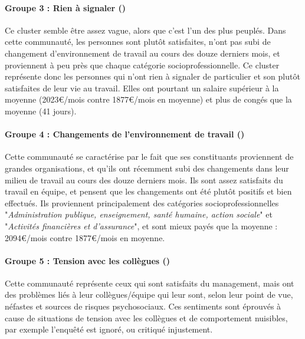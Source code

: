 \documentclass[11pt,fleqn,openany,frenchb]{book} %
\begin{document}
\paragraph{Groupe 3 : Rien à signaler (\RAS)\\}
Ce cluster semble être assez vague, alors que c'est l'un des plus peuplés. Dans cette communauté, les personnes sont plutôt satisfaites, n'ont pas subi de changement d'environnement de travail au cours des douze derniers mois, et proviennent à peu près que chaque catégorie socioprofessionnelle. Ce cluster représente donc les personnes qui n'ont rien à signaler de particulier et son plutôt satisfaites de leur vie au travail. Elles ont pourtant un salaire supérieur à la moyenne (2023\euro{}/mois contre 1877\euro{}/mois en moyenne) et plus de congés que la moyenne (41 jours).

\paragraph{Groupe 4 : Changements   de   l'environnement   de
travail (\GLOB)\\}
Cette communauté se caractérise par le fait que ses constituants proviennent de grandes organisations, et qu'ils ont récemment subi des changements dans leur milieu de travail au cours des douze derniers mois. Ils sont assez satisfaits du travail en équipe, et pensent que les changements ont été plutôt positifs et bien effectués. Ils proviennent principalement des catégories socioprofessionnelles "\textit{Administration publique, enseignement, santé humaine, action sociale}" et "\textit{Activités financières et d'assurance}", et sont mieux payés que la moyenne : 2094\euro{}/mois contre 1877\euro{}/mois en moyenne.

\paragraph{Groupe 5 : Tension avec les collègues (\ENV)\\}
Cette communauté représente ceux qui sont satisfaits du management, mais ont des problèmes liés à leur collègues/équipe qui leur sont, selon leur point de vue, néfastes et sources de risques psychosociaux. Ces sentiments sont éprouvés à cause de situations de tension avec les collègues et de comportement nuisibles, par exemple l'enquêté est ignoré, ou critiqué injustement.
\end{document}
